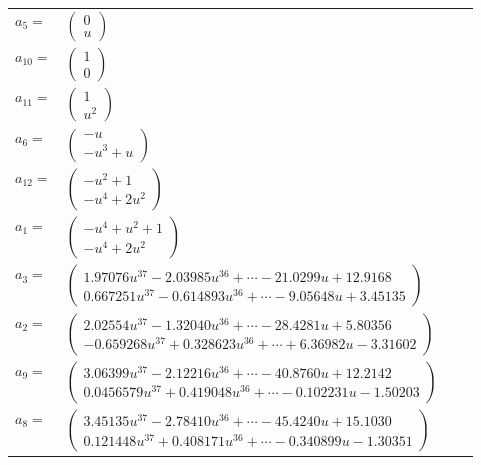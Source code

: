 \documentclass[1p]{elsarticle_modified}
\theoremstyle{definition}
\begin{document}
\begin{tabular}{m{7pt} m{180pt} m{7pt} m{180pt} }
\flushright $a_{5}=$&$\begin{pmatrix}0\\u\end{pmatrix}$ \\
\flushright $a_{10}=$&$\begin{pmatrix}1\\0\end{pmatrix}$ \\
\flushright $a_{11}=$&$\begin{pmatrix}1\\u^2\end{pmatrix}$ \\
\flushright $a_{6}=$&$\begin{pmatrix}- u\\- u^3+u\end{pmatrix}$ \\
\flushright $a_{12}=$&$\begin{pmatrix}- u^2+1\\- u^4+2 u^2\end{pmatrix}$ \\
\flushright $a_{1}=$&$\begin{pmatrix}- u^4+u^2+1\\- u^4+2 u^2\end{pmatrix}$ \\
\flushright $a_{3}=$&$\begin{pmatrix}1.97076 u^{37}-2.03985 u^{36}+\cdots-21.0299 u+12.9168\\0.667251 u^{37}-0.614893 u^{36}+\cdots-9.05648 u+3.45135\end{pmatrix}$ \\
\flushright $a_{2}=$&$\begin{pmatrix}2.02554 u^{37}-1.32040 u^{36}+\cdots-28.4281 u+5.80356\\-0.659268 u^{37}+0.328623 u^{36}+\cdots+6.36982 u-3.31602\end{pmatrix}$ \\
\flushright $a_{9}=$&$\begin{pmatrix}3.06399 u^{37}-2.12216 u^{36}+\cdots-40.8760 u+12.2142\\0.0456579 u^{37}+0.419048 u^{36}+\cdots-0.102231 u-1.50203\end{pmatrix}$ \\
\flushright $a_{8}=$&$\begin{pmatrix}3.45135 u^{37}-2.78410 u^{36}+\cdots-45.4240 u+15.1030\\0.121448 u^{37}+0.408171 u^{36}+\cdots-0.340899 u-1.30351\end{pmatrix}$ \\

\end{tabular}
\end{document}
